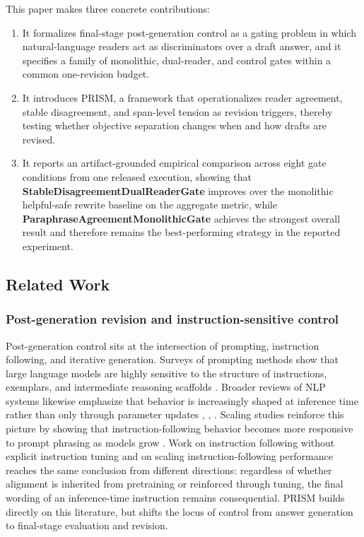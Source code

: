 \documentclass{article}
\begin{document}
\label{sec:contributions}

This paper makes three concrete contributions:

\begin{enumerate}
  \item It formalizes final-stage post-generation control as a gating problem in which natural-language readers act as discriminators over a draft answer, and it specifies a family of monolithic, dual-reader, and control gates within a common one-revision budget.
  \item It introduces PRISM, a framework that operationalizes reader agreement, stable disagreement, and span-level tension as revision triggers, thereby testing whether objective separation changes when and how drafts are revised.
  \item It reports an artifact-grounded empirical comparison across eight gate conditions from one released execution, showing that \textbf{StableDisagreementDualReaderGate} improves over the monolithic helpful-safe rewrite baseline on the aggregate metric, while \textbf{ParaphraseAgreementMonolithicGate} achieves the strongest overall result and therefore remains the best-performing strategy in the reported experiment.
\end{enumerate}

\subsection{Related Work}

\label{sec:related_work}

\subsubsection{Post-generation revision and instruction-sensitive control}

\label{sec:post_generation_revision_and_instruction}

Post-generation control sits at the intersection of prompting, instruction following, and iterative generation. Surveys of prompting methods show that large language models are highly sensitive to the structure of instructions, exemplars, and intermediate reasoning scaffolds \cite{liu2022pretrain}. Broader reviews of NLP systems likewise emphasize that behavior is increasingly shaped at inference time rather than only through parameter updates \cite{khurana2022natural}, \cite{zhao2023survey}, \cite{cao2023comprehensive}. Scaling studies reinforce this picture by showing that instruction-following behavior becomes more responsive to prompt phrasing as models grow \cite{chung2022scaling}. Work on instruction following without explicit instruction tuning \cite{hewitt2024instruction} and on scaling instruction-following performance \cite{elder2025boosting} reaches the same conclusion from different directions: regardless of whether alignment is inherited from pretraining or reinforced through tuning, the final wording of an inference-time instruction remains consequential. PRISM builds directly on this literature, but shifts the locus of control from answer generation to final-stage evaluation and revision.
\end{document}
